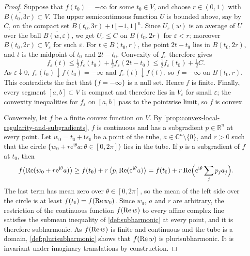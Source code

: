 \begin{proof}
Suppose that $f(t_0)=-\infty$ for some $t_0\in V$, and choose $r\in(0,1)$ with $\overline{B(t_0,3r)}\subset V$. The upper semicontinuous function $U$ is bounded above, say by $C$, on the compact set $\overline{B(t_0,3r)}+\mathrm i[-1,1]^n$. Since $U_\varepsilon(w)$ is an average of $U$ over the ball $\overline{B(w,\varepsilon)}$, we get $U_\varepsilon\leq C$ on $B(t_0,2r)$ for $\varepsilon<r$; moreover $B(t_0,2r)\subset V_\varepsilon$ for such $\varepsilon$. For $t\in B(t_0,r)$, the point $2t-t_0$ lies in $B(t_0,2r)$, and $t$ is the midpoint of $t_0$ and $2t-t_0$. Convexity of $f_\varepsilon$ therefore gives
\[
 f_\varepsilon(t)
   \leq\tfrac12f_\varepsilon(t_0)
                     +\tfrac12f_\varepsilon(2t-t_0)
   \leq\tfrac12f_\varepsilon(t_0)+\tfrac12C.
\]
As $\varepsilon\downarrow0$, $f_\varepsilon(t_0)\downarrow f(t_0)=-\infty$ and $f_\varepsilon(t)\downarrow f(t)$, so $f=-\infty$ on $B(t_0,r)$. This contradicts the fact that $\{f=-\infty\}$ is a null set. Hence $f$ is finite. Finally, every segment $[a,b]\subset V$ is compact and therefore lies in $V_\varepsilon$ for small $\varepsilon$; the convexity inequalities for $f_\varepsilon$ on $[a,b]$ pass to the pointwise limit, so $f$ is convex.

Conversely, let $f$ be a finite convex function on $V$. By \cref{prop:convex-local-regularity-and-subgradients}, $f$ is continuous and has a subgradient $p\in\mathbb R^n$ at every point. Let $w_0=t_0+\mathrm is_0$ be a point of the tube, $a\in\mathbb C^n\setminus\{0\}$, and $r>0$ such that the circle $\{w_0+r\mathrm e^{\mathrm i\theta}a:\theta\in[0,2\pi]\}$ lies in the tube. If $p$ is a subgradient of $f$ at $t_0$, then
\[
 f\bigl(\operatorname{Re}(w_0+r\mathrm e^{\mathrm i\theta}a)\bigr)
 \geq f(t_0)+r\left\langle p,
                       \operatorname{Re}(\mathrm e^{\mathrm i\theta}a)\right\rangle
 =f(t_0)+r\operatorname{Re}\Bigl(\mathrm e^{\mathrm i\theta}\sum_jp_ja_j\Bigr).
\]
The last term has mean zero over $\theta\in[0,2\pi]$, so the mean of the left side over the circle is at least $f(t_0)=f(\operatorname{Re} w_0)$. Since $w_0$, $a$ and $r$ are arbitrary, the restriction of the continuous function $f(\operatorname{Re} w)$ to every affine complex line satisfies the submean inequality of \cref{def:subharmonic} at every point, and it is therefore subharmonic. As $f(\operatorname{Re} w)$ is finite and continuous and the tube is a domain, \cref{def:plurisubharmonic} shows that $f(\operatorname{Re} w)$ is plurisubharmonic. It is invariant under imaginary translations by construction.
\end{proof}

